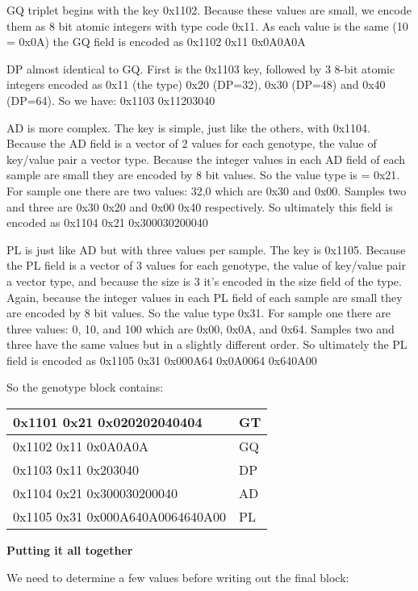 \documentclass[8pt]{article}
\begin{document}
GQ triplet begins with the key 0x1102.  Because these values are small, we encode them as 8 bit atomic integers with type code 0x11.  As each value is the same (10 = 0x0A) the GQ field is encoded as 0x1102 0x11 0x0A0A0A

DP almost identical to GQ.  First is the 0x1103 key, followed by 3 8-bit atomic integers encoded as 0x11 (the type) 0x20 (DP=32), 0x30 (DP=48) and 0x40 (DP=64).  So we have: 0x1103 0x11203040

AD is more complex.  The key is simple, just like the others, with 0x1104.  Because the AD field is a vector of 2 values for each genotype, the value of key/value pair a vector type.  Because the integer values in each AD field of each sample are small they are encoded by 8 bit values.  So the value type is = 0x21.  For sample one there are two values: 32,0 which are 0x30 and 0x00.  Samples two and three are 0x30 0x20 and 0x00 0x40 respectively.  So ultimately this field is encoded as 0x1104 0x21 0x300030200040

PL is just like AD but with three values per sample.  The key is 0x1105.  Because the PL field is a vector of 3 values for each genotype, the value of key/value pair a vector type, and because the size is 3 it's encoded in the size field of the type.  Again, because the integer values in each PL field of each sample are small they are encoded by 8 bit values.  So the value type 0x31.  For sample one there are three values: 0, 10, and 100 which are 0x00, 0x0A, and 0x64.  Samples two and three have the same values but in a slightly different order.  So ultimately the PL field is encoded as 0x1105 0x31 0x000A64 0x0A0064 0x640A00

So the genotype block contains:

\vspace{0.3cm}
\begin{tabular}{|l| l|} \hline
0x1101 0x21 0x020202040404 & GT \\ \hline
0x1102 0x11 0x0A0A0A & GQ \\ \hline
0x1103 0x11 0x203040 & DP \\ \hline
0x1104 0x21 0x300030200040 & AD \\ \hline
0x1105 0x31 0x000A640A0064640A00 & PL \\ \hline
\end{tabular}
\vspace{0.3cm}

\textbf{Putting it all together}

We need to determine a few values before writing out the final block:
\end{document}
